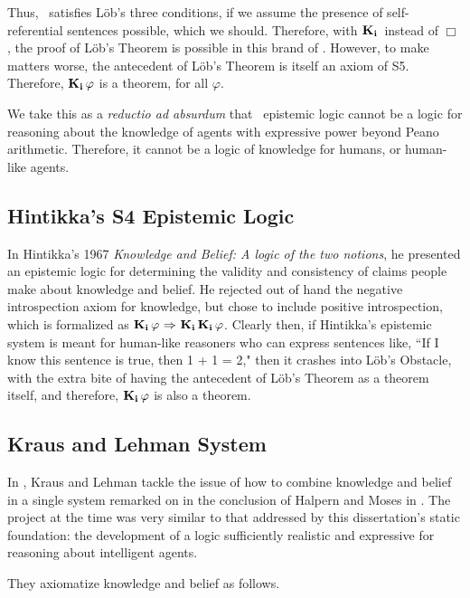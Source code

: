 Thus, \SFive\ satisfies L\"ob's three conditions, if we assume the presence of self-referential sentences possible, which we should. Therefore, with $\mathbf{K}_{\mathbf{i}}\,$ instead of $\Box$, the proof of L\"ob's Theorem is possible in this brand of \SFive. However, to make matters worse, the antecedent of L\"ob's Theorem is itself an axiom of S5. Therefore, $\mathbf{K}_{\mathbf{i}}\,\varphi$ is a theorem, for all $\varphi$.

We take this as a \emph{reductio ad absurdum} that \SFive\ epistemic logic cannot be a logic for reasoning about the knowledge of agents with expressive power beyond Peano arithmetic. Therefore, it cannot be a logic of knowledge for humans, or human-like agents.

\subsection{Hintikka's S4 Epistemic Logic}
\label{sec:hint_s4}
In Hintikka's 1967 \emph{Knowledge and Belief: A logic of the two notions}, he presented an epistemic logic for determining the validity and consistency of claims people make about knowledge and belief. He rejected out of hand the negative introspection axiom for knowledge, but chose to include positive introspection, which is formalized as $\mathbf{K}_{\mathbf{i}}\,\varphi{\ \Rightarrow \ }\mathbf{K}_{\mathbf{i}}\,\mathbf{K}_{\mathbf{i}}\,\varphi$. Clearly then, if Hintikka's epistemic system is meant for human-like reasoners who can express sentences like, ``If I know this sentence is true, then 1 + 1 = 2," then it crashes into L\"ob's Obstacle, with the extra bite of having the antecedent of L\"ob's Theorem as a theorem itself, and therefore, $\mathbf{K}_{\mathbf{i}}\,\varphi$ is also a theorem.

\subsection{Kraus and Lehman System}
\label{sec:kl}

In \cite{KrausLehman}, Kraus and Lehman tackle the issue of how to combine knowledge and belief in a single system remarked on in the conclusion of Halpern and Moses in \cite{HalpernMoses}. The project at the time was very similar to that addressed by this dissertation's static foundation: the development of a logic sufficiently realistic and expressive for reasoning about intelligent agents. 

They axiomatize knowledge and belief as follows.

